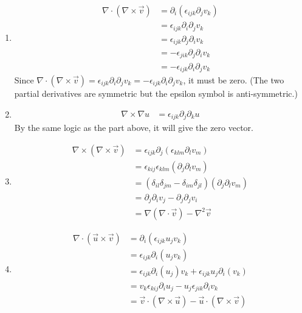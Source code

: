 \begin{Answer}
\begin{enumerate}[label=(\alph*)]
\item
\begin{align*}
\nabla \cdot (\nabla \times \vec{v}) &= \partial_i(\epsilon_{ijk} \partial_j v_k) \\
&= \epsilon_{ijk} \partial_i\partial_j v_k \\
&= \epsilon_{ijk} \partial_j\partial_i v_k \\
&= -\epsilon_{jik} \partial_j\partial_i v_k \\
&= -\epsilon_{ijk} \partial_i\partial_j v_k
\end{align*}
Since $\nabla \cdot (\nabla \times \vec{v}) = \epsilon_{ijk} \partial_i\partial_j v_k = -\epsilon_{ijk} \partial_i\partial_j v_k$, it must be zero. (The two partial derivatives are symmetric but the epsilon symbol is anti-symmetric.)
\item
\begin{align*}
\nabla \times \nabla u &= \epsilon_{ijk} \partial_j \partial_k u    
\end{align*}
By the same logic as the part above, it will give the zero vector.
\item 
\begin{align*}
\nabla \times (\nabla \times \vec{v}) &= \epsilon_{ijk} \partial_j(\epsilon_{klm} \partial_l v_m) \\
&= \epsilon_{kij}\epsilon_{klm} (\partial_j\partial_l v_m) \\
&= (\delta_{il}\delta_{jm}-\delta_{im}\delta_{jl}) (\partial_j\partial_l v_m) \\
&= \partial_j\partial_i v_j - \partial_j\partial_j v_i \\
&= \nabla (\nabla \cdot \vec{v}) - \nabla^2 \vec{v} 
\end{align*}
\item 
\begin{align*}
\nabla \cdot (\vec{u} \times \vec{v}) &= \partial_i(\epsilon_{ijk}u_jv_k) \\
&= \epsilon_{ijk}\partial_i(u_jv_k) \\
&= \epsilon_{ijk}\partial_i(u_j)v_k + \epsilon_{ijk}u_j\partial_i(v_k) \\
&= v_k\epsilon_{kij}\partial_iu_j - u_j\epsilon_{jik}\partial_iv_k \\
&= \vec{v} \cdot (\nabla \times \vec{u}) - \vec{u} \cdot (\nabla \times \vec{v})
\end{align*}
\end{enumerate}
\end{Answer}

